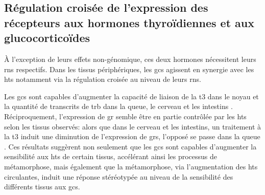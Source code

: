 \documentclass[../main.tex]{subfiles}
\begin{document}
\subsection{Régulation croisée de l'expression des récepteurs aux hormones thyroïdiennes et aux glucocorticoïdes}
À l'exception de leurs effets non-génomique, ces deux hormones nécessitent leurs \glspl{rn} respectifs.
Dans les tissus périphériques, les \glspl{gc} agissent en synergie avec les \glspl{ht} notamment via la régulation croisée au niveau de leurs \glspl{rn}.
\par
Les \glspl{gc} sont capables d'augmenter la capacité de liaison de la \gls{t3} dans le noyau \citep{Kikuyama1983} et la quantité de transcrits de \gls{trb} dans la queue, le cerveau et les intestins \citep{Bonett2010}.
Réciproquement, l'expression de \gls{gr} semble être en partie contrôlée par les \glspl{ht} selon les tissus observés: alors que dans le cerveau et les intestins, un traitement à la \gls{t3} induit une diminution de l'expression de \glspl{gr}, l'opposé se passe dans la queue \citep{Krain2004}.
Ces résultats suggèrent non seulement que les \glspl{gc} sont capables d'augmenter la sensibilité aux \glspl{ht} de certain tissus, accélérant ainsi les processus de métamorphose, mais également que la métamorphose, via l'augmentation des \glspl{ht} circulantes, induit une réponse stéréotypée au niveau de la sensibilité des différents tissus aux \glspl{gc}.
\end{document}
